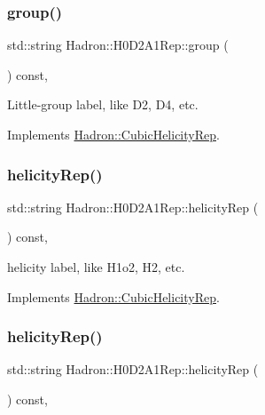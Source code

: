 \subsubsection{\texorpdfstring{group()}{group()}\hspace{0.1cm}{\footnotesize\ttfamily [5/5]}}
{\footnotesize\ttfamily std\+::string Hadron\+::\+H0\+D2\+A1\+Rep\+::group (\begin{DoxyParamCaption}{ }\end{DoxyParamCaption}) const\hspace{0.3cm}{\ttfamily [inline]}, {\ttfamily [virtual]}}

Little-\/group label, like D2, D4, etc. 

Implements \mbox{\hyperlink{structHadron_1_1CubicHelicityRep_a101a7d76cd8ccdad0f272db44b766113}{Hadron\+::\+Cubic\+Helicity\+Rep}}.

\mbox{\label{structHadron_1_1H0D2A1Rep_ae0a667c77e5bdd60a1225ac10f4e1247}} 
\subsubsection{\texorpdfstring{helicityRep()}{helicityRep()}\hspace{0.1cm}{\footnotesize\ttfamily [1/3]}}
{\footnotesize\ttfamily std\+::string Hadron\+::\+H0\+D2\+A1\+Rep\+::helicity\+Rep (\begin{DoxyParamCaption}{ }\end{DoxyParamCaption}) const\hspace{0.3cm}{\ttfamily [inline]}, {\ttfamily [virtual]}}

helicity label, like H1o2, H2, etc. 

Implements \mbox{\hyperlink{structHadron_1_1CubicHelicityRep_af1096946b7470edf0a55451cc662f231}{Hadron\+::\+Cubic\+Helicity\+Rep}}.

\mbox{\label{structHadron_1_1H0D2A1Rep_ae0a667c77e5bdd60a1225ac10f4e1247}} 
\subsubsection{\texorpdfstring{helicityRep()}{helicityRep()}\hspace{0.1cm}{\footnotesize\ttfamily [2/3]}}
{\footnotesize\ttfamily std\+::string Hadron\+::\+H0\+D2\+A1\+Rep\+::helicity\+Rep (\begin{DoxyParamCaption}{ }\end{DoxyParamCaption}) const\hspace{0.3cm}{\ttfamily [inline]}, {\ttfamily [virtual]}}

